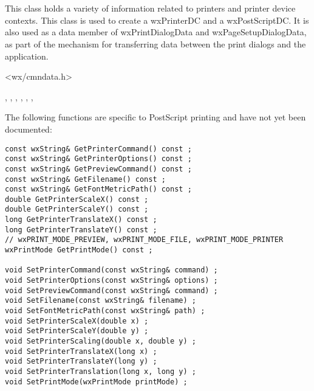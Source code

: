 \section{}\label{wxprintdata}

This class holds a variety of information related to printers and
printer device contexts. This class is used to create a wxPrinterDC
and a wxPostScriptDC. It is also used as a data member of wxPrintDialogData
and wxPageSetupDialogData, as part of the mechanism for transferring data
between the print dialogs and the application.




<wx/cmndata.h>


, 
, 
, 
, 
, 
, 


The following functions are specific to PostScript printing
and have not yet been documented:

\begin{verbatim}
const wxString& GetPrinterCommand() const ;
const wxString& GetPrinterOptions() const ;
const wxString& GetPreviewCommand() const ;
const wxString& GetFilename() const ;
const wxString& GetFontMetricPath() const ;
double GetPrinterScaleX() const ;
double GetPrinterScaleY() const ;
long GetPrinterTranslateX() const ;
long GetPrinterTranslateY() const ;
// wxPRINT_MODE_PREVIEW, wxPRINT_MODE_FILE, wxPRINT_MODE_PRINTER
wxPrintMode GetPrintMode() const ;

void SetPrinterCommand(const wxString& command) ;
void SetPrinterOptions(const wxString& options) ;
void SetPreviewCommand(const wxString& command) ;
void SetFilename(const wxString& filename) ;
void SetFontMetricPath(const wxString& path) ;
void SetPrinterScaleX(double x) ;
void SetPrinterScaleY(double y) ;
void SetPrinterScaling(double x, double y) ;
void SetPrinterTranslateX(long x) ;
void SetPrinterTranslateY(long y) ;
void SetPrinterTranslation(long x, long y) ;
void SetPrintMode(wxPrintMode printMode) ;
\end{verbatim}

